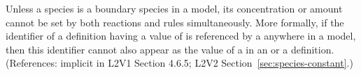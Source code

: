 Unless a species is a boundary species in a model, its concentration or
amount cannot be set by both reactions and rules simultaneously.  More
formally, if the identifier of a \Species definition having a
 value of  is referenced by a
\SpeciesReference anywhere in a model, then this identifier cannot also
appear as the value of a  in an \AssignmentRule or a
\RateRule definition.  (References: implicit in L2V1 Section 4.6.5; L2V2
Section~\ref{sec:species-constant}.)
